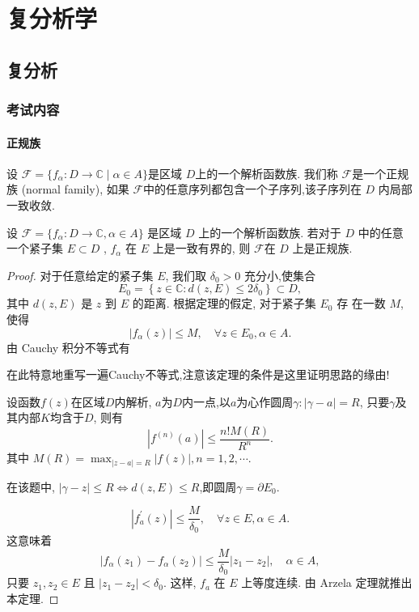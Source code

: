 \part{复分析学}
\chapter{复分析}
\section{考试内容}
\subsection{正规族}
\begin{defi}[正规族]\label{def: normal family}
    设 $\mathscr{F}=\{f_\alpha \colon D\to \mathbb{C}\mid \alpha \in A\}$是区域 $D$上的一个解析函数族. 我们称 $\mathscr{F}$是一个正规族 (normal family), 如果 $\mathscr{F}$中的任意序列都包含一个子序列,该子序列在 $D$ 内局部一致收敛.
\end{defi}
\begin{thm}[Montel 定理]\label{thm: Montel thm}
    设 $\mathscr{F}=\{f_\alpha \colon D\to \mathbb
    {C} ,\alpha\in A\}$ 是区域 $D$ 上的一个解析函数族. 若对于 $D$ 中的任意一个紧子集 $E\subset D$ , $f_\alpha$ 在 $E$ 上是一致有界的, 则 $\mathscr{F}$在 $D$ 上是正规族.
\end{thm}
\begin{proof}
    对于任意给定的紧子集 $E$, 我们取 $\delta_0>0$ 充分小,使集合
$$
E_0=\left\{z \in \mathbb{C}: d(z, E) \leqslant 2 \delta_0\right\} \subset D,
$$
其中 $d(z, E)$ 是 $z$ 到 $E$ 的距离. 根据定理的假定, 对于紧子集 $E_0$ 存 在一数 $M$,使得
$$
\left|f_\alpha(z)\right| \leqslant M, \quad \forall z \in E_0, \alpha \in A .
$$
由 Cauchy 积分不等式有
\begin{fancybox}
    在此特意地重写一遍Cauchy不等式,注意该定理的条件是这里证明思路的缘由!
    \begin{theorem}
        设函数$f(z)$在区域$D$内解析, {\color{red} $a$为$D$内一点,以$a$为心作圆周$\gamma \colon |\gamma-a|=R$, 只要$\gamma$及其内部$K$均含于$D$}, 则有
        \begin{equation*}
            |f^{(n)}(a)|\leqslant \frac{n! M(R)}{R^n}.
        \end{equation*}
        其中 $M(R)=\max_{|z-a|=R}|f(z)|,n=1,2,\cdots$.
    \end{theorem}
    在该题中, $|\gamma-z|\leqslant R \iff d(z,E)\leqslant R$,即圆周$\gamma=\partial E_0$.
\end{fancybox}
$$
\left|f_a^{\prime}(z)\right| \leqslant \frac{M}{\delta_0}, \quad \forall z \in E, \alpha \in A .
$$
这意味着
$$
\left|f_\alpha\left(z_1\right)-f_\alpha\left(z_2\right)\right| \leqslant \frac{M}{\delta_0}\left|z_1-z_2\right|, \quad \alpha \in A,
$$
只要 $z_1, z_2 \in E$ 且 $\left|z_1-z_2\right|<\delta_0$. 这样, $f_a$ 在 $E$ 上等度连续. 由 Arzela 定理就推出本定理. 
\end{proof}
